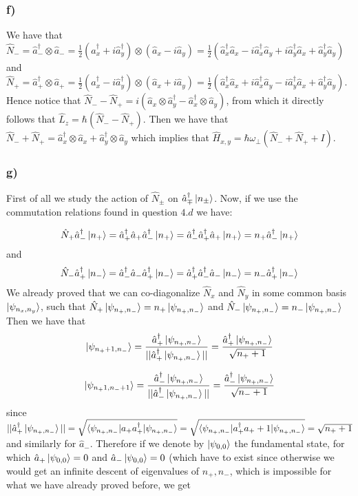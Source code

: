 \documentclass[10pt,a4paper]{book}
\begin{document}
\subsubsection{f)}

We have that $\hat{N}_-=\hat{a}_-^{\dagger}\otimes \hat{a}_-=\frac{1}{2}(\hat{a}_x^{\dagger}+i\hat{a}_y^{\dagger})\otimes(\hat{a}_x-i\hat{a}_y)=\frac{1}{2}(\hat{a}_x^{\dagger}\hat{a}_x-i\hat{a}_x^{\dagger}\hat{a}_y+i\hat{a}_y^{\dagger}\hat{a}_x+\hat{a}_y^{\dagger}\hat{a}_y)$ and
$\hat{N}_+=\hat{a}_+^{\dagger}\otimes\hat{a}_+=\frac{1}{2}(\hat{a}_x^{\dagger}-i\hat{a}_y^{\dagger})\otimes (\hat{a}_x+i\hat{a}_y)=\frac{1}{2}(\hat{a}_x^{\dagger}\hat{a}_x+i\hat{a}_x^{\dagger}\hat{a}_y-i\hat{a}_y^{\dagger}\hat{a}_x+\hat{a}_y^{\dagger}\hat{a}_y)$.
Hence notice that $\hat{N}_--\hat{N}_+=i(\hat{a}_x\otimes\hat{a}_y^{\dagger}-\hat{a}_x^{\dagger}\otimes\hat{a}_y)$, from which it directly follows that $\hat{L}_z=\hbar(\hat{N}_--\hat{N}_+)$. Then we have that $\hat{N}_-+\hat{N}_+=\hat{a}_x^{\dagger}\otimes \hat{a}_x+\hat{a}_y^{\dagger}\otimes \hat{a}_y$ which implies that $\hat{H}_{x,y}=\hbar\omega_{\perp}(\hat{N}_-+\hat{N}_++I)$.

\subsubsection*{g)}
First of all we study the action of $\hat{N}_{\pm}$ on $\hat{a}_{\mp}^{\dagger}\ket{n_{\pm}}$.  Now, if we use the commutation relations found in question $4.d$ we have:

$$\hat{N}_{+}\hat{a}_{-}^{\dagger}\ket{n_{+}}=\hat{a}_+^{\dagger}\hat{a}_+\hat{a}_-^{\dagger}\ket{n_+}=\hat{a}_-^{\dagger}\hat{a}_+^{\dagger}\hat{a}_+\ket{n_+}=n_+\hat{a}^{\dagger}_-\ket{n_+}$$
and 
$$\hat{N}_{-}\hat{a}_{+}^{\dagger}\ket{n_{-}}=\hat{a}_-^{\dagger}\hat{a}_-\hat{a}_+^{\dagger}\ket{n_-}=\hat{a}_+^{\dagger}\hat{a}_-^{\dagger}\hat{a}_-\ket{n_-}=n_-\hat{a}^{\dagger}_+\ket{n_-}$$
We already proved that we can co-diagonalize $\hat{N}_x$ and $\hat{N}_y$ in some common basis $\ket{\psi_{n_x,n_y}}$, such that
$\hat{N}_+\ket{\psi_{n_+,n_-}}=n_+\ket{\psi_{n_+,n_-}}$ and $\hat{N}_-\ket{\psi_{n_+,n_-}}=n_-\ket{\psi_{n_+,n_-}}$
Then we have that 
$$\ket{\psi_{n_++1,n_-}}=\frac{\hat{a}_+^{\dagger}\ket{\psi_{n_+,n_-}}}{||\hat{a}_+^{\dagger}\ket{\psi_{n_+,n_-}}||}=\frac{\hat{a}_+^{\dagger}\ket{\psi_{n_+,n_-}}}{\sqrt{n_++1}}$$

$$\ket{\psi_{n_+1,n_-+1}}=\frac{\hat{a}_-^{\dagger}\ket{\psi_{n_+,n_-}}}{||\hat{a}_-^{\dagger}\ket{\psi_{n_+,n_-}}||}=\frac{\hat{a}_-^{\dagger}\ket{\psi_{n_+,n_-}}}{\sqrt{n_-+1}}$$
since $||\hat{a}_+^{\dagger}\ket{\psi_{n_+,n_-}}||=\sqrt{\braket{\psi_{n_+,n_-}|a_+a_+^{\dagger}|\psi_{n_+,n_-}}}=\sqrt{\braket{\psi_{n_+,n_-}|a_+^{\dagger}a_++1|\psi_{n_+,n_-}}}=\sqrt{n_++1}$ and similarly for $\hat{a}_-$.
Therefore if we denote by $\ket{\psi_{0,0}}$ the fundamental state, for which $\hat{a}_+\ket{\psi_{0,0}}=0$ and $\hat{a}_-\ket{\psi_{0,0}}=0$ (which have to exist since otherwise we would get an infinite descent of eigenvalues of $n_+,n_-$, which is impossible for what we have already proved before, we get
\end{document}

